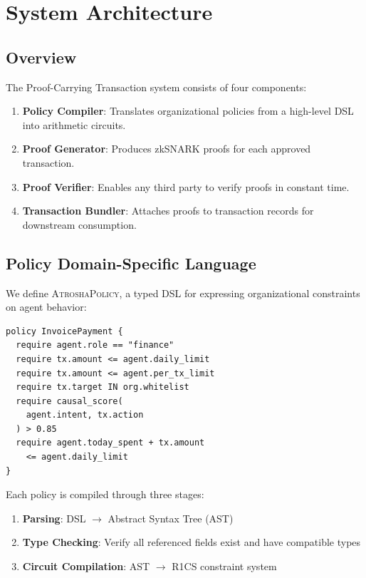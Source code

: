 \documentclass[conference]{IEEEtran}
\begin{document}
\section{System Architecture}

\subsection{Overview}

The Proof-Carrying Transaction system consists of four components:

\begin{enumerate}
    \item \textbf{Policy Compiler}: Translates organizational policies from a high-level DSL into arithmetic circuits.
    \item \textbf{Proof Generator}: Produces zkSNARK proofs for each approved transaction.
    \item \textbf{Proof Verifier}: Enables any third party to verify proofs in constant time.
    \item \textbf{Transaction Bundler}: Attaches proofs to transaction records for downstream consumption.
\end{enumerate}

\subsection{Policy Domain-Specific Language}

We define \textsc{AtroshaPolicy}, a typed DSL for expressing organizational constraints on agent behavior:

\begin{lstlisting}[basicstyle=\ttfamily\small, frame=single]
policy InvoicePayment {
  require agent.role == "finance"
  require tx.amount <= agent.daily_limit
  require tx.amount <= agent.per_tx_limit
  require tx.target IN org.whitelist
  require causal_score(
    agent.intent, tx.action
  ) > 0.85
  require agent.today_spent + tx.amount
    <= agent.daily_limit
}
\end{lstlisting}

Each policy is compiled through three stages:
\begin{enumerate}
    \item \textbf{Parsing}: DSL $\rightarrow$ Abstract Syntax Tree (AST)
    \item \textbf{Type Checking}: Verify all referenced fields exist and have compatible types
    \item \textbf{Circuit Compilation}: AST $\rightarrow$ R1CS constraint system
\end{enumerate}
\end{document}

